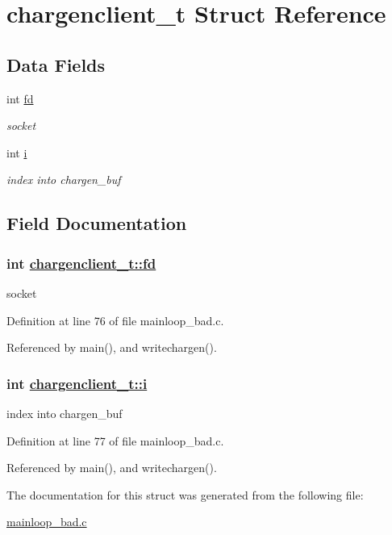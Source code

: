 \hypertarget{structchargenclient__t}{
\section{chargenclient\_\-t Struct Reference}
\label{structchargenclient__t}
}
\subsection*{Data Fields}
\begin{CompactItemize}
\item 
int \hyperlink{structchargenclient__t_o0}{fd}
\begin{CompactList}\small\item\em socket \item\end{CompactList}\item 
int \hyperlink{structchargenclient__t_o1}{i}
\begin{CompactList}\small\item\em index into chargen\_\-buf \item\end{CompactList}\end{CompactItemize}


\subsection{Field Documentation}
\hypertarget{structchargenclient__t_o0}{
\subsubsection[fd]{\setlength{\rightskip}{0pt plus 5cm}int \hyperlink{structchargenclient__t_o0}{chargenclient\_\-t::fd}}}
\label{structchargenclient__t_o0}


socket 



Definition at line 76 of file mainloop\_\-bad.c.

Referenced by main(), and writechargen().\hypertarget{structchargenclient__t_o1}{
\subsubsection[i]{\setlength{\rightskip}{0pt plus 5cm}int \hyperlink{structchargenclient__t_o1}{chargenclient\_\-t::i}}}
\label{structchargenclient__t_o1}


index into chargen\_\-buf 



Definition at line 77 of file mainloop\_\-bad.c.

Referenced by main(), and writechargen().

The documentation for this struct was generated from the following file:\begin{CompactItemize}
\item 
\hyperlink{mainloop__bad_8c}{mainloop\_\-bad.c}\end{CompactItemize}

